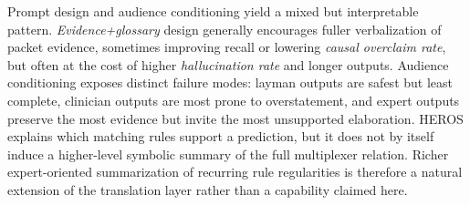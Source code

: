 \documentclass[sigconf]{acmart}
\begin{document}

Prompt design and audience conditioning yield a mixed but interpretable pattern. \emph{Evidence+glossary} design generally encourages fuller verbalization of packet evidence, sometimes improving recall or lowering \emph{causal overclaim rate}, but often at the cost of higher \emph{hallucination rate} and longer outputs. Audience conditioning exposes distinct failure modes: layman outputs are safest but least complete, clinician outputs are most prone to overstatement, and expert outputs preserve the most evidence but invite the most unsupported elaboration. HEROS explains which matching rules support a prediction, but it does not by itself induce a higher-level symbolic summary of the full multiplexer relation. Richer expert-oriented summarization of recurring rule regularities is therefore a natural extension of the translation layer rather than a capability claimed here.
\end{document}
